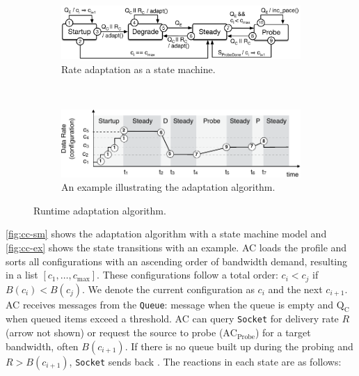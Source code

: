 \begin{figure}
  \begin{subfigure}[t]{\columnwidth}
    \centering
    \includegraphics[width=\columnwidth]{figures/cc.pdf}
    \caption{Rate adaptation as a state machine.}
    \vspace{1em}
    \label{fig:cc-sm}
  \end{subfigure}
  \\
  \centering
  \begin{subfigure}[t]{\columnwidth}
    \centering
    \includegraphics[width=0.9\columnwidth]{figures/cc2.pdf}
    \caption{An example illustrating the adaptation algorithm.}
    \label{fig:cc-ex}
  \end{subfigure}
  \caption{Runtime adaptation algorithm.}
  \label{fig:cc}
\end{figure}

\autoref{fig:cc-sm} shows the adaptation algorithm with a state machine model
and \autoref{fig:cc-ex} shows the state transitions with an example. AC loads
the profile and sorts all configurations with an ascending order of bandwidth
demand, resulting in a list $[c_1, \dots, c_{\max}]$.  These configurations
follow a total order: $c_i < c_j$ if $B(c_i) < B(c_j)$.  We denote the current
configuration as $c_i$ and the next $c_{i+1}$.  AC receives messages from the
\texttt{Queue}: message \qe{} when the queue is empty and $\text{Q}_\text{C}$
when queued items exceed a threshold. AC can query \texttt{Socket} for delivery
rate $R$ (arrow not shown) or request the source to probe
($\text{AC}_{\text{Probe}}$) for a target bandwidth, often $B(c_{i+1})$. If
there is no queue built up during the probing and $R > B(c_{i+1})$,
\texttt{Socket} sends back \spd{}. The reactions in each state are as follows:

